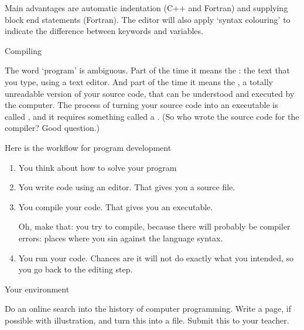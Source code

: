Main advantages are automatic indentation (C++ and Fortran) and
supplying block end statements (Fortran). The editor will also apply
`syntax colouring' to indicate the difference between keywords and variables.

 {Compiling}

The word `program' is ambiguous. Part of the time it means the
: the text that you type, using a text
editor. And part of the time it means the , a
totally unreadable version of your source code, that can be understood and
executed by the computer. The process of turning your source code into
an executable is called , and it requires
something called a . (So who wrote the source code
for the compiler? Good question.)

Here is the workflow for program development
\begin{enumerate}
\item You think about how to solve your program
\item You write code using an editor. That gives you a source file.
\item You compile your code. That gives you an executable.

  Oh, make that: you try to compile,
  because there will probably be compiler errors: places where you
  sin against the language syntax.
\item You run your code. Chances are it will not do exactly what you
  intended, so you go back to the editing step.
\end{enumerate}

 {Your environment}

\begin{exercise}
  \label{ex:ssh-scp}
  Do an online search into the history of computer programming.
  Write a page, if possible with illustration, and turn this into a
   file. Submit this to your teacher.
\end{exercise}
